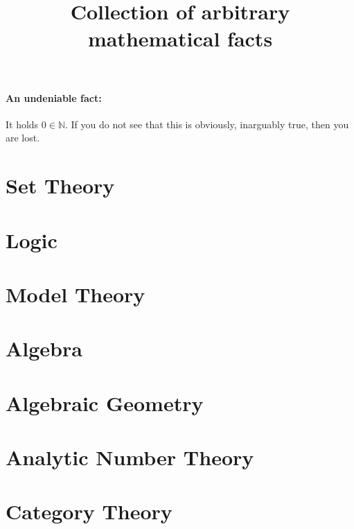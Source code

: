 \documentclass{scrartcl}
\title{Collection of arbitrary mathematical facts}
\date{}
\newcommand{\N}{\mathbb{N}}
\begin{document}
\maketitle

\tableofcontents

\paragraph{An undeniable fact:} It holds $0 \in \N$. If you do not see that this is obviously, inarguably true, then you are lost.

\section{Set Theory}



\section{Logic}



\section{Model Theory}



\section{Algebra}



\section{Algebraic Geometry}



\section{Analytic Number Theory}



\section{Category Theory}


\end{document}
